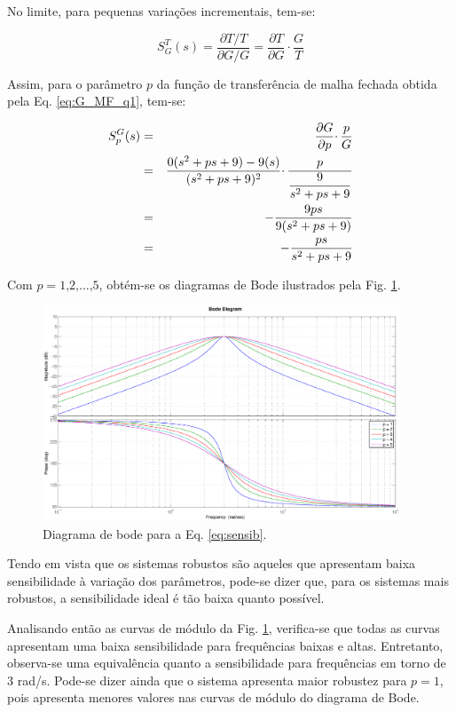 No limite, para pequenas variações incrementais, tem-se:

\begin{equation}
S_G^T(s) = \frac{\partial T / T}{ \partial G / G} 
         = \frac{\partial T}{\partial G} \cdotp \frac{G}{T}
\end{equation}

Assim, para o parâmetro $p$ da função de transferência de malha fechada
obtida pela Eq. \ref{eq:G_MF_q1}, tem-se:

\begin{eqnarray}
S_p^G(s) & = & \frac{\partial G}{\partial p} \cdotp \frac{p}{G}\nonumber \\
         & = & \frac{0(s^2 + ps + 9) - 9(s)}{(s^2 + ps + 9)^2} \cdotp
               \frac{p}{\displaystyle\frac{9}{s^2 + ps + 9}}\nonumber\\
         & = & - \frac{9ps}{9(s^2 + ps + 9)}\nonumber\\
         & = & - \frac{ps}{s^2 + ps + 9}\label{eq:sensib}
\end{eqnarray}

Com $p = 1\text{,} 2\text{,} \ldots\text{,} 5$, obtém-se os diagramas de Bode
ilustrados pela Fig. \ref{fig:diag_bode_sensib}.

\begin{figure}[htb]
\centering
    \includegraphics[width=0.95\textwidth]{imgs/questao1/bode_sensib}
    \caption{Diagrama de bode para a Eq. \ref{eq:sensib}.}
    \label{fig:diag_bode_sensib}
\end{figure}

Tendo em vista que os sistemas robustos são aqueles que apresentam baixa
sensibilidade à variação dos parâmetros, pode-se dizer que, para os sistemas
mais robustos, a sensibilidade ideal é tão baixa quanto possível.

Analisando então as curvas de módulo da Fig. \ref{fig:diag_bode_sensib},
verifica-se que todas as curvas apresentam uma baixa sensibilidade para
frequências baixas e altas. Entretanto, observa-se uma equivalência quanto a
sensibilidade para frequências em torno de 3 rad/s. Pode-se dizer ainda que o
sistema apresenta maior robustez para $p = 1$, pois apresenta menores valores
nas curvas de módulo do diagrama de Bode.

